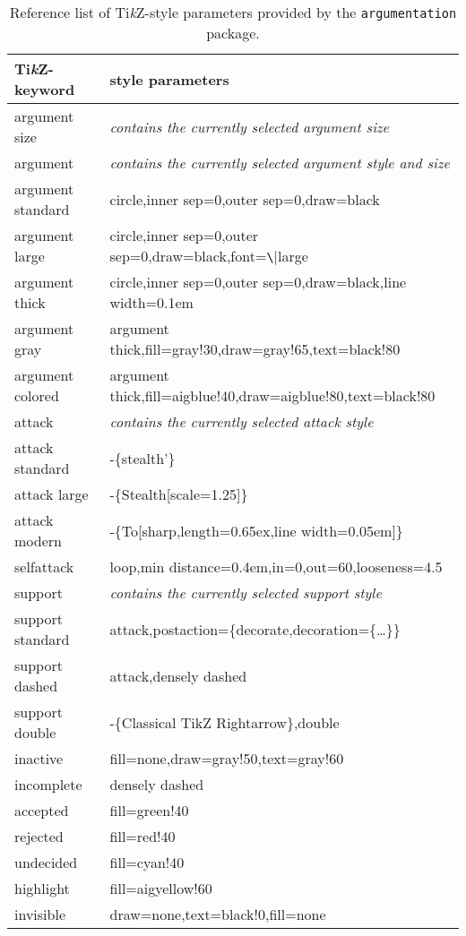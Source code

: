 \documentclass[headings=normal]{scrartcl}
\newcommand{\tikzname}{Ti\emph{k}Z\xspace}
\newcommand{\argumentation}{\texttt{argumentation}\xspace}
\begin{document}
    \begin{table}[ht]
        \centering
        \ttfamily
        \begin{tabular}{l|l}
            \toprule
            \tikzname-keyword & style parameters \\
            \midrule
            \textsf{argument size} & \emph{contains the currently selected argument size}\\
            \textsf{argument} & \emph{contains the currently selected argument style and size}\\
            \textsf{argument standard} & circle,inner sep=0,outer sep=0,draw=black\\
            \textsf{argument large} & circle,inner sep=0,outer sep=0,draw=black,font=\verb|\|large\\
            \textsf{argument thick} & circle,inner sep=0,outer sep=0,draw=black,line width=0.1em\\
            \textsf{argument gray} & argument thick,fill=gray!30,draw=gray!65,text=black!80\\
            \textsf{argument colored} & argument thick,fill=aigblue!40,draw=aigblue!80,text=black!80\\
            \midrule
            \textsf{attack} & \emph{contains the currently selected attack style}\\
            \textsf{attack standard} & -\{stealth'\}\\
            \textsf{attack large} & -\{Stealth[scale=1.25]\}\\
            \textsf{attack modern} & -\{To[sharp,length=0.65ex,line width=0.05em]\}\\
            \textsf{selfattack} & loop,min distance=0.4em,in=0,out=60,looseness=4.5\\
            \midrule
            \textsf{support} & \emph{contains the currently selected support style}\\
            \textsf{support standard} & attack,postaction=\{decorate,decoration=\{\dots\}\}\\
            \textsf{support dashed} & attack,densely dashed\\
            \textsf{support double} & -\{Classical TikZ Rightarrow\},double\\
            \midrule
            \textsf{inactive} & fill=none,draw=gray!50,text=gray!60\\
            \textsf{incomplete} & densely dashed\\
            \textsf{accepted} & fill=green!40\\
            \textsf{rejected} & fill=red!40\\
            \textsf{undecided} & fill=cyan!40\\
            \textsf{highlight} & fill=aigyellow!60\\
            \textsf{invisible} & draw=none,text=black!0,fill=none\\
            \bottomrule
        \end{tabular}
        \caption{Reference list of \tikzname-style parameters provided by the \argumentation package.}
        \label{tab:styles}
    \end{table}
\end{document}
